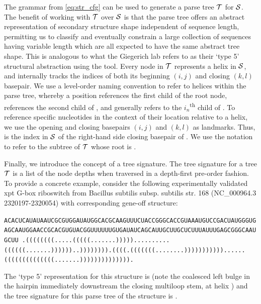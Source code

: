 The grammar from \eqref{eq:str_cfg} can be used to generate a parse tree ${\mathcal T}$ for ${\mathcal S}$. The benefit of working with ${\mathcal T}$ over ${\mathcal S}$ is that the parse tree offers an abstract representation of secondary structure shape independent of sequence length, permitting us to classify and eventually constrain a large collection of sequences having variable length which are all expected to have the same abstract tree shape. This is analogous to what the Giegerich lab refers to as their `type 5' structural abstraction using the \rshapes tool. Every node in ${\mathcal T}$ represents a helix in ${\mathcal S}$, and internally tracks the indices of both its beginning $(i,j)$ and closing $(k,l)$ basepair. We use a level-order naming convention to refer to helices within the parse tree, whereby a position  references the first child of the root node,  references the second child of , and generally  refers to the $i_n$\textsuperscript{th} child of . To reference specific nucleotides in the context of their location relative to a helix, we use the opening and closing basepairs $(i,j)$ and $(k,l)$ as landmarks. Thus,  is the index in ${\mathcal S}$ of the right-hand side closing basepair of . We use the notation  to refer to the subtree of ${\mathcal T}$ whose root is .

Finally, we introduce the concept of a tree signature. The tree signature for a tree ${\mathcal T}$ is a list of the node depths when traversed in a depth-first pre-order fashion. To provide a concrete example, consider the following experimentally validated xpt G-box riboswitch from Bacillus subtilis subsp. subtilis str. 168 (NC\_000964.3 2320197-2320054) with corresponding gene-off structure:

\begin{center} \label{}
  \ssmall\tt ACACUCAUAUAAUCGCGUGGAUAUGGCACGCAAGUUUCUACCGGGCACCGUAAAUGUCCGACUAUGGGUGAGCAAUGGAACCGCACGUGUACGGUUUUUUGUGAUAUCAGCAUUGCUUGCUCUUUAUUUGAGCGGGCAAUGCUU
  \ssmall\tt .((((((((.....(((((.......)))))..........((((((.......))))))..)))))))).((((.(((((((........)))))))))))......((((((((((((((.......)))))))))))))).
\end{center}

The \rshapes `type 5' representation for this structure is \ms{[[][]][][]} (note the coalesced left bulge in the hairpin immediately downstream the closing multiloop stem, at helix ) and the tree signature for this parse tree of the structure is \ms{[0, 1, 2, 2, 1, 1]}.

